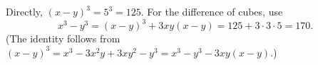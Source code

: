 Directly, $(x-y)^3=5^3=\boxed{125}$. For the difference of cubes, use
\[
x^3-y^3=(x-y)^3+3xy(x-y)=125+3\cdot3\cdot5=\boxed{170}.
\]
(The identity follows from $(x-y)^3=x^3-3x^2y+3xy^2-y^3=x^3-y^3-3xy(x-y)$.)
